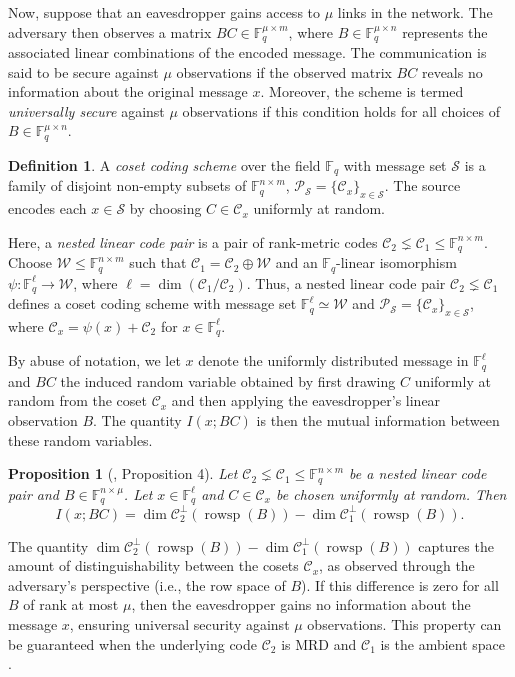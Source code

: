 \documentclass[onecolumn,draftclsnofoot,12pt]{IEEEtran}
\newcommand{\F}{\mathbb{F}}
\newcommand{\C}{\mathcal{C}}
\renewcommand{\P}{\mathcal{P}}
\DeclareMathOperator{\rowsp}{rowsp}
\theoremstyle{plain} %
\newtheorem{proposition}[theorem]{Proposition}
\theoremstyle{definition}
\newtheorem{definition}[theorem]{Definition}
\begin{document}
Now, suppose that an eavesdropper gains access to $\mu$ links in the network. The adversary then observes a matrix $BC\in \F_q^{\mu \times m}$, where $B\in \F_q^{\mu \times n}$ represents the associated linear combinations of the encoded message. The communication is said to be secure against $\mu$ observations if the observed matrix $BC$ reveals no information about the original message $x$. Moreover, the scheme is termed \emph{universally secure} against $\mu$ observations if this condition holds for all choices of $B\in \F_q^{\mu \times n}$.

\begin{definition}
A \emph{coset coding scheme} over the field $\F_q$ with message set $\mathcal{S}$ is a family of disjoint non-empty subsets of $\F_q^{n\times m}$, $\mathcal{P}_\mathcal{S} = \{ \C_{x}\}_{x\in \mathcal{S}}$. The source encodes each $x\in \mathcal{S}$ by choosing $C\in \mathcal{C}_x$ uniformly at random.
\end{definition}

Here, a \emph{nested linear code pair} is a pair of rank-metric codes $\C_2 \lneq \C_1 \leq \F_q^{n\times m}$. Choose $\mathcal{W}\leq \F_q^{n\times m}$ such that $\C_1 = \C_2 \oplus \mathcal{W}$ and an $\F_q$-linear isomorphism $\psi\colon \F_q^{\ell}\rightarrow \mathcal{W}$, where $\ell = \dim (\C_1/\C_2)$. Thus, a nested linear code pair $\C_2 \lneq \C_1$ defines a coset coding scheme with message set $\F_q^{\ell}\simeq \mathcal{W}$ and $\P_{\mathcal{S}} = \{\C_x\}_{x\in\mathcal{S}}$, where $\C_x = \psi(x) + \C_2$ for $x\in \F_q^\ell$.

By abuse of notation, we let $x$ denote the uniformly distributed message in $\F_q^{\ell}$ and $BC$ the induced random variable obtained by first drawing $C$ uniformly at random from the coset $\C_x$ and then applying the eavesdropper's linear observation $B$. The quantity $I(x;BC)$ is then the mutual information between these random variables. 

\begin{proposition}[\cite{unifying}, Proposition 4] \label{prop:martinez} Let $\C_2\lneq \C_1 \leq \F_q^{n\times m}$ be a nested linear code pair and $B\in \F_q^{ n \times \mu}$. 
Let $x\in \F_q^{\ell}$ and $C\in \C_x$ be chosen uniformly at random.
Then
\[
    I(x;BC) = \dim \C_2^\perp(\rowsp(B)) - \dim \C_1^\perp(\rowsp(B)).
\]
\end{proposition}

The quantity $\dim \C_2^\perp(\rowsp(B)) - \dim \C_1^\perp(\rowsp(B))$ captures the amount of distinguishability between the cosets $\C_x$, as observed through the adversary's perspective (i.e., the row space of $B$). If this difference is zero for all $B$ of rank at most $\mu$, then the eavesdropper gains no information about the message $x$, ensuring universal security against $\mu$ observations. This property can be guaranteed when the underlying code $\C_2$ is MRD and $\C_1$ is the ambient space \cite{Universal}.
\end{document}
